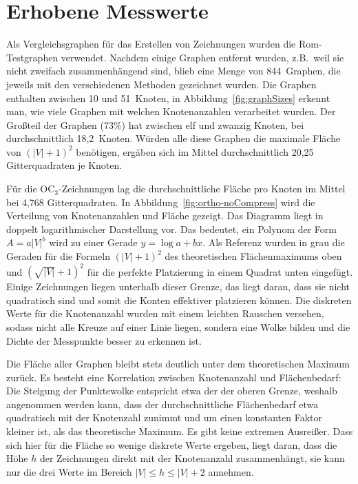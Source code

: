 \documentclass[a4paper]{scrreprt}
\theoremstyle{definition}
\begin{document}
\section{Erhobene Messwerte}

Als Vergleichsgraphen für das Erstellen von Zeichnungen wurden die Rom-Testgraphen verwendet. Nachdem einige Graphen entfernt wurden, z.B.\ weil sie nicht zweifach zusammenhängend sind, blieb eine Menge von 844~Graphen, die jeweils mit den verschiedenen Methoden gezeichnet wurden. Die Graphen enthalten zwischen 10 und 51~Knoten, in Abbildung~\ref{fig:graphSizes} erkennt man, wie viele Graphen mit welchen Knotenanzahlen verarbeitet wurden. Der Großteil der Graphen (73\%) hat zwischen elf und zwanzig Knoten, bei durchschnittlich 18,2~Knoten. Würden alle diese Graphen die maximale Fläche von $(|V|+1)^2$ benötigen, ergäben sich im Mittel durchschnittlich 20,25 Gitterquadraten je Knoten.

Für die OC$_3$-Zeichnungen lag die durchschnittliche Fläche pro Knoten im Mittel bei 4,768 Gitterquadraten. In Abbildung~\ref{fig:ortho-noCompress} wird die Verteilung von Knotenanzahlen und Fläche gezeigt. Das Diagramm liegt in doppelt logarithmischer Darstellung vor. Das bedeutet, ein Polynom der Form $A = a|V|^b$ wird zu einer Gerade $y = \log{a} + bx$. Als Referenz wurden in grau die Geraden für die Formeln $(|V|+1)^2$ des theoretischen Flächenmaximums oben und $(\sqrt{|V|}+1)^2$ für die perfekte Platzierung in einem Quadrat unten eingefügt. Einige Zeichnungen liegen unterhalb dieser Grenze, das liegt daran, dass sie nicht quadratisch sind und somit die Konten effektiver platzieren können. Die diskreten Werte für die Knotenanzahl wurden mit einem leichten Rauschen versehen, sodass nicht alle Kreuze auf einer Linie liegen, sondern eine Wolke bilden und die Dichte der Messpunkte besser zu erkennen ist. 

Die Fläche aller Graphen bleibt stets deutlich unter dem theoretischen Maximum zurück. Es besteht eine Korrelation zwischen Knotenanzahl und Flächenbedarf: Die Steigung der Punktewolke entspricht etwa der der oberen Grenze, weshalb angenommen werden kann, dass der durchschnittliche Flächenbedarf etwa quadratisch mit der Knotenzahl zunimmt und um einen konstanten Faktor kleiner ist, als das theoretische Maximum. Es gibt keine extremen Ausreißer. Dass sich hier für die Fläche so wenige diskrete Werte ergeben, liegt daran, dass die Höhe $h$ der Zeichnungen direkt mit der Knotenanzahl zusammenhängt, sie kann nur die drei Werte im Bereich $|V| \leq h \leq |V| + 2$ annehmen.
\end{document}
